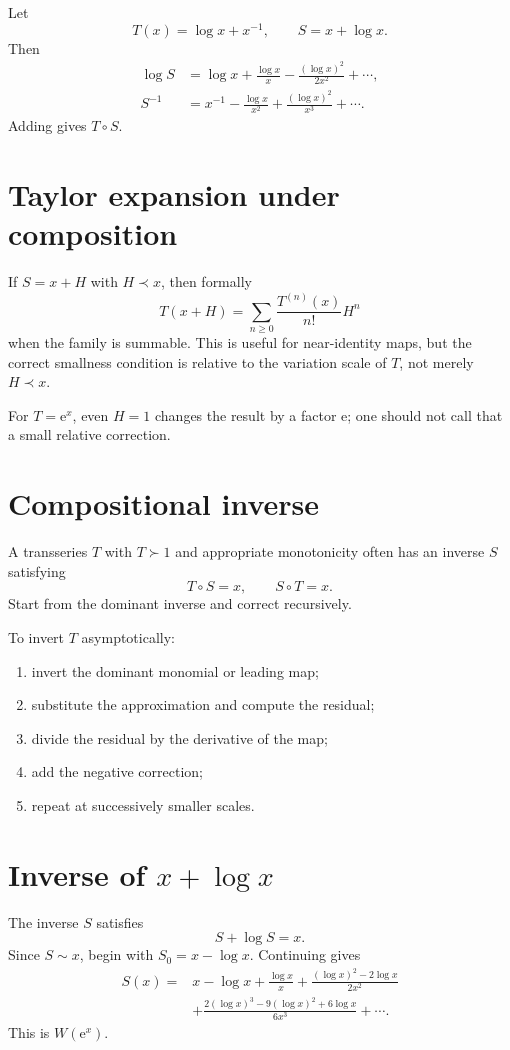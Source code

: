 \documentclass[11pt,oneside,openany]{book}
\newcommand{\e}{\mathrm{e}}
\newcommand{\compose}{\mathbin{\circ}}
\theoremstyle{plain}
\theoremstyle{definition}
\theoremstyle{remark}
\begin{document}
\begin{worked}
Let
\[
  T(x)=\log x+x^{-1},
  \qquad S=x+\log x.
\]
Then
\[
\begin{aligned}
\log S
&=\log x+\frac{\log x}{x}
 -\frac{(\log x)^2}{2x^2}+\cdots,\\
S^{-1}
&=x^{-1}-\frac{\log x}{x^2}
 +\frac{(\log x)^2}{x^3}+\cdots.
\end{aligned}
\]
Adding gives $T\compose S$.
\end{worked}

\section{Taylor expansion under composition}
If $S=x+H$ with $H\prec x$, then formally
\[
  T(x+H)=\sum_{n\ge0}\frac{T^{(n)}(x)}{n!}H^n
\]
when the family is summable. This is useful for near-identity maps, but the correct smallness condition is relative to the variation scale of $T$, not merely $H\prec x$.

For $T=\e^x$, even $H=1$ changes the result by a factor $\e$; one should not call that a small relative correction.

\section{Compositional inverse}
A transseries $T$ with $T\succ1$ and appropriate monotonicity often has an inverse $S$ satisfying
\[
  T\compose S=x,
  \qquad S\compose T=x.
\]
Start from the dominant inverse and correct recursively.

\begin{procedurebox}
To invert $T$ asymptotically:
\begin{enumerate}
  \item invert the dominant monomial or leading map;
  \item substitute the approximation and compute the residual;
  \item divide the residual by the derivative of the map;
  \item add the negative correction;
  \item repeat at successively smaller scales.
\end{enumerate}
\end{procedurebox}

\section{Inverse of \texorpdfstring{$x+\log x$}{x+log x}}
The inverse $S$ satisfies
\[
  S+\log S=x.
\]
Since $S\sim x$, begin with $S_0=x-\log x$. Continuing gives
\[
\begin{aligned}
S(x)={}&x-\log x+\frac{\log x}{x}
+\frac{(\log x)^2-2\log x}{2x^2}\\
&+\frac{2(\log x)^3-9(\log x)^2+6\log x}{6x^3}
+\cdots.
\end{aligned}
\]
This is $W(\e^x)$.
\end{document}
